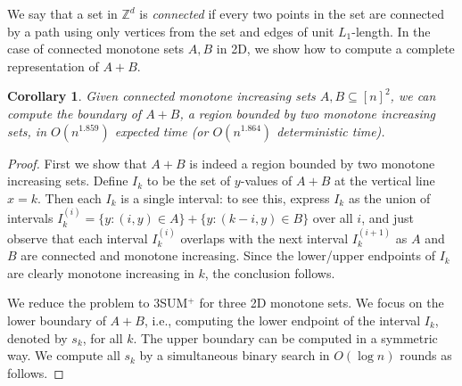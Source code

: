 \documentclass[11pt]{article}
\newcommand{\LONG}[1]{#1}\newcommand{\SHORT}[1]{}
\newtheorem{corollary}[theorem]{Corollary}
\newcommand{\Z}{\mathbb{Z}}
\begin{document}
\SHORT{
As noted in the full paper,
bounded monotone (min,+) convolution reduces to
3SUM$^+$ for 2D monotone sets, and is equivalent to
(min,+) convolution in the bounded differences case and
to binary histogram indexing.  Thus, all these
problems can now be solved in $O(n^{1.859})$ expected time (or
$O(n^{1.864})$ deterministic time).
}
\LONG{
We say that a set in $\Z^d$ is \emph {connected}
if every two points in the set are connected by a path
using only vertices from the set and edges of unit $L_1$-length.
In the case of connected monotone sets $A,B$ in 2D, we show how
to compute a complete representation of $A+B$.

\begin{corollary}\label{cor-monotone-2d}
Given connected monotone increasing sets $A,B\subseteq [n]^2$,
we can compute the boundary of $A+B$, a region bounded by
two monotone increasing sets,
in $O(n^{1.859})$ expected time (or
$O(n^{1.864})$ deterministic time).
\end{corollary}
\begin{proof}
First we show that $A+B$ is indeed a region bounded by
two monotone increasing sets.
Define $I_k$ to be the set of $y$-values of $A+B$ at
the vertical line $x=k$.
Then each $I_k$ is a single interval: to see this,
express $I_k$ as the union of intervals
$I_k^{(i)}=\{y: (i,y)\in A\}+\{y: (k-i,y)\in B\}$ over all $i$, and just observe that
each interval $I_k^{(i)}$ overlaps with the
next interval $I_k^{(i+1)}$ as $A$ and $B$ are connected and monotone increasing.  Since the lower/upper endpoints of $I_k$ are clearly monotone increasing in $k$, the conclusion follows.

We reduce the problem to 3SUM$^+$ for three 2D monotone sets.
We focus on the lower boundary of $A+B$, i.e.,
computing the lower endpoint of the interval $I_k$, denoted
by $s_k$, for all $k$.   The upper
boundary can be computed in a symmetric way.
We compute all $s_k$ by a simultaneous binary search in
$O(\log n)$ rounds as follows.


\end{proof}}
\end{document}
